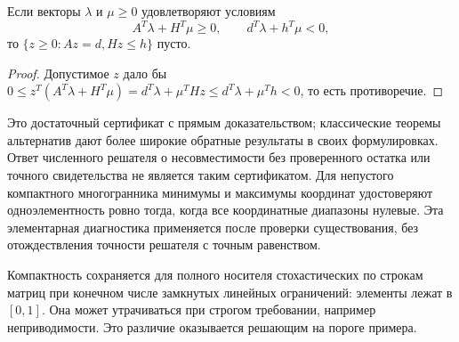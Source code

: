 \begin{proposition}\label{prop:dual}
{Если векторы $\lambda$ и $\mu\geq0$ удовлетворяют условиям}
\begin{equation}\label{eq:dual}
 A^T\lambda+H^T\mu\geq0,\qquad d^T\lambda+h^T\mu<0,
\end{equation}
{то $\{z\geq0:Az=d,Hz\leq h\}$ пусто.}
\end{proposition}
\begin{proof}
{Допустимое $z$ дало бы $0\leq z^T(A^T\lambda+H^T\mu)=d^T\lambda+\mu^THz\leq d^T\lambda+\mu^Th<0$, то есть противоречие.}
\end{proof}

{Это достаточный сертификат с прямым доказательством; классические теоремы альтернатив дают более широкие обратные результаты в своих формулировках. Ответ численного решателя о несовместимости без проверенного остатка или точного свидетельства не является таким сертификатом. Для непустого компактного многогранника минимумы и максимумы координат удостоверяют одноэлементность ровно тогда, когда все координатные диапазоны нулевые. Эта элементарная диагностика применяется после проверки существования, без отождествления точности решателя с точным равенством.}

{Компактность сохраняется для полного носителя стохастических по строкам матриц при конечном числе замкнутых линейных ограничений: элементы лежат в $[0,1]$. Она может утрачиваться при строгом требовании, например неприводимости. Это различие оказывается решающим на пороге примера.}

